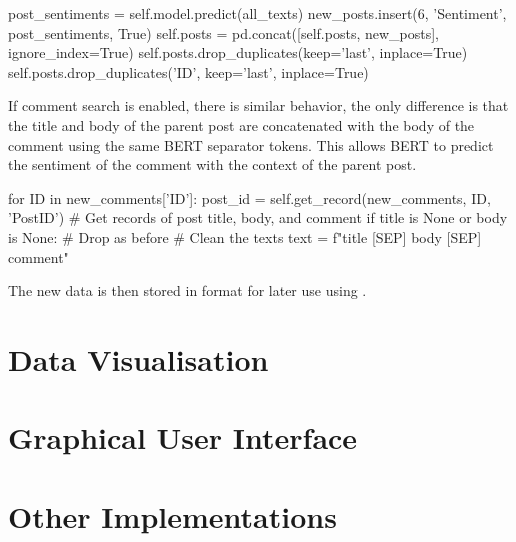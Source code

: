 \begin{python}
post_sentiments = self.model.predict(all_texts)
new_posts.insert(6, 'Sentiment', post_sentiments, True)
self.posts = pd.concat([self.posts, new_posts], ignore_index=True)
self.posts.drop_duplicates(keep='last', inplace=True)
self.posts.drop_duplicates('ID', keep='last', inplace=True)
\end{python}

If comment search is enabled, there is similar behavior, the only difference is that the title and body of the parent post are concatenated with the body of the comment using the same BERT separator tokens. This allows BERT to predict the sentiment of the comment with the context of the parent post.

\begin{python}
for ID in new_comments['ID']:
    post_id = self.get_record(new_comments, ID, 'PostID')
    # Get records of post title, body, and comment
    if title is None or body is None:
        # Drop as before
    # Clean the texts
    text = f"{title} [SEP] {body} [SEP] {comment}"
\end{python}

The new data is then stored in  format for later use using .

\section{Data Visualisation}

\section{Graphical User Interface}

\section{Other Implementations}